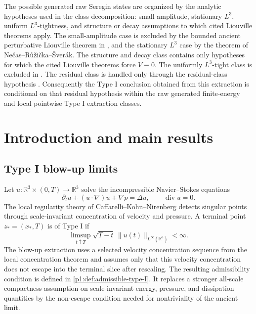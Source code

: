 \documentclass[11pt]{amsart}
\theoremstyle{plain}
\theoremstyle{definition}
\theoremstyle{remark}
\numberwithin{equation}{section}
\newcommand{\R}{\mathbb R}
\newcommand{\divergence}{\operatorname{div}}
\begin{document}
The possible generated raw Seregin states are organized by the
analytic hypotheses used in the class decomposition: small amplitude,
stationary \(L^3\), uniform \(L^3\)-tightness, and structure or decay assumptions to which
cited Liouville theorems apply.  The small-amplitude case is excluded by the bounded ancient
perturbative Liouville theorem in , and the stationary \(L^3\) case by
the theorem of Ne\v{c}as--R\r{u}\v{z}i\v{c}ka--\v{S}ver\'ak.  The
structure and decay class contains only hypotheses for which the cited Liouville
theorems force \(V\equiv0\).  The uniformly \(L^3\)-tight class is excluded in
.  The residual class is handled only through the
residual-class hypothesis .
Consequently the Type I conclusion obtained from this extraction is conditional
on that residual hypothesis within the raw generated finite-energy and local
pointwise Type I extraction classes.

\section{Introduction and main results}\label{p1:sec:introduction}

\subsection{Type I blow-up limits}

Let \(u:\R^3\times(0,T)\to\R^3\) solve the incompressible Navier--Stokes
equations
\begin{equation}\label{p1:eq:NS}
   \partial_tu+(u\cdot\nabla)u+\nabla p=\Delta u,\qquad
   \divergence u=0.
\end{equation}
The local regularity theory of Caffarelli--Kohn--Nirenberg \cite{CKN1982}
detects singular points through scale-invariant concentration of velocity and
pressure.  A terminal point \(z_*=(x_*,T)\) is of Type I if
\begin{equation}\label{p1:eq:type-I-bound}
   \limsup_{t\uparrow T}\sqrt{T-t}\,
   \|u(t)\|_{L^\infty(\R^3)}<\infty .
\end{equation}
The blow-up extraction uses a selected velocity concentration sequence from
the local concentration theorem and assumes only that this velocity
concentration does not escape into the terminal slice after rescaling.  The
resulting admissibility condition is defined in
\cref{p1:def:admissible-type-I}.  It replaces a stronger all-scale compactness
assumption on scale-invariant energy, pressure, and dissipation quantities by
the non-escape condition needed for nontriviality of the ancient limit.
\end{document}
